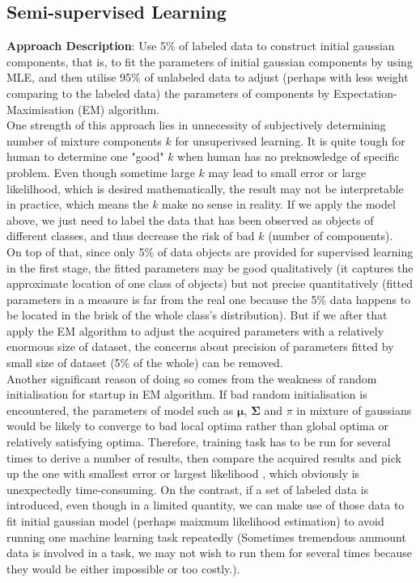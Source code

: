 \documentclass[11pt,a4paper]{article}
\newcommand{\htab}{\hspace*{0.63cm}}
\newcommand{\bs}[1]{\boldsymbol{#1}}
\begin{document}
\subsection{Semi-supervised Learning}
\htab \textbf{Approach Description}: Use 5\% of labeled data to construct initial gaussian components,
that is, to fit the parameters of initial gaussian components by using MLE, 
and then utilise 95\% of unlabeled data to adjust (perhaps with less weight comparing to 
the labeled data) the parameters of components by Expectation-Maximisation (EM) algorithm. \\
\htab One strength of this approach lies in unnecessity of subjectively determining number of mixture
components $k$ for unsuperivsed learning. It is quite tough for human 
to determine one "good" $k$ when human has no preknowledge of specific problem.
Even though sometime large $k$ may lead to small error 
or large likelilhood, which is desired mathematically, the result may not be interpretable in practice, 
which means the $k$ make no sense in reality.
If we apply the model above, we just need to label the data that has been observed as objects of
different classes, and thus decrease the risk of bad $k$ (number of components). \\
\htab On top of that, since only 5\% of data objects are provided for supervised learning in
the first stage, the fitted parameters may be good qualitatively (it captures the approximate 
location of one class of objects) but not precise quantitatively (fitted parameters in a measure
is far from the real one because the 5\% data happens to be located in the brisk of the whole
class's distribution). But if we after that apply the EM 
algorithm to adjust the acquired parameters with a relatively enormous size of dataset, the 
concerns about precision of parameters fitted by small size of dataset (5\% of the whole) can be
 removed. \\
\htab Another significant reason of doing so comes from the weakness of random initialisation for startup in 
EM algorithm. If bad random initialisation is encountered, 
the parameters of model such as $\bs{\mu}$, $\bs{\Sigma}$ and $\pi$ in mixture of gaussians would 
be likely to converge to bad local optima rather than global optima or relatively satisfying optima.
Therefore, training task has to be run for several times to derive a number of results,
 then compare the acquired results and pick up the one with smallest error or largest likelihood
, which obviously is unexpectedly time-consuming. On the contrast, if a set of 
 labeled data is introduced, even though in a limited quantity, we can make use of those data to fit 
 initial gaussian model (perhaps maixmum likelihood estimation) to avoid 
 running one machine learning task repeatedly (Sometimes tremendous ammount data is involved in
 a task, we may not wish to run them for several times because they would be either impossible or 
 too costly.). 
\newpage
\appendix
\end{document}
